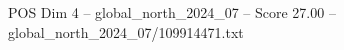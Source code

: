 \begin{textsample}{POS Dim 4 – global\_north\_2024\_07 – Score 27.00 – global\_north\_2024\_07/109914471.txt}
\end{textsample}
